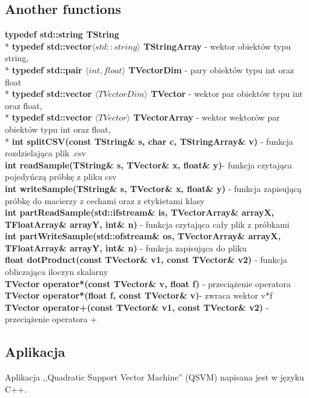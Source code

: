 \documentclass[[10pt,a4paper]{article}
\begin{document}
\begin{enumerate}
\subsection{Another functions}
\setlength{\parskip}{1ex plus 0.5ex minus 0.2ex}
\textbf{typedef std::string TString}\\*
\textbf{typedef std::vector$\langle std::string\rangle$ TStringArray} - wektor obiektów typu string,\\*	
\textbf{typedef std::pair $\langle int, float \rangle$ TVectorDim} - pary obiektów typu int oraz float\\*
\textbf{typedef std::vector $\langle TVectorDim \rangle$ TVector }- wektor par obiektów typu int oraz float,\\*
\textbf{typedef std::vector $\langle TVector \rangle$ TVectorArray} - wektor wektorów par obiektów typu int oraz float, \\*
\textbf{int splitCSV(const TString\& s, char c, TStringArray\& v)} - funkcja rozdzielająca plik .csv\\
\textbf{int readSample(TString\& s, TVector\& x, float\& y)}- funkcja czytająca pojedyńczą próbkę z pliku csv\\
\textbf{int writeSample(TString\& s, TVector\& x, float\& y)} - funkcja zapisującą próbkę do macierzy z cechami oraz z etykietami klasy\\
\textbf{int partReadSample(std::ifstream\& is, TVectorArray\& arrayX, TFloatArray\& arrayY, int\& n) }- funkcja czytająca cały plik z próbkami\\
\textbf{int partWriteSample(std::ofstream\& os, TVectorArray\& arrayX, TFloatArray\& arrayY, int\& n)} - funkcja zapisująca do pliku\\
\textbf{float dotProduct(const TVector\& v1, const TVector\& v2)} - funkcja obliczająca iloczyn skalarny\\
\textbf{TVector operator*(const TVector\& v, float f) }- przeciążenie operatora \\
\textbf{TVector operator*(float f, const TVector\& v)}- zwraca wektor v*f\\
\textbf{TVector operator+(const TVector\& v1, const TVector\& v2) }- przeciążenie operatora +\\

\subsection{Aplikacja}
\noindent Aplikacja ,,Quadratic Support Vector Machine'' (QSVM) napisana jest w języku C++.


\end{enumerate}
\end{document}
